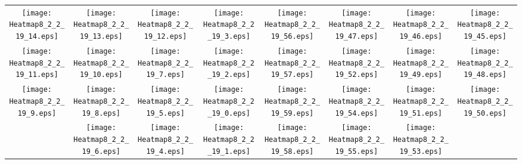\documentclass{standalone}
\begin{document}
\begin{tabular}{ *8{c} }
\texttt{[image: Heatmap8\_2\_2\_19\_14.eps]} & \texttt{[image: Heatmap8\_2\_2\_19\_13.eps]} & \texttt{[image: Heatmap8\_2\_2\_19\_12.eps]} & \texttt{[image: Heatmap8\_2\_2\_19\_3.eps]} & \texttt{[image: Heatmap8\_2\_2\_19\_56.eps]} & \texttt{[image: Heatmap8\_2\_2\_19\_47.eps]} & \texttt{[image: Heatmap8\_2\_2\_19\_46.eps]} & \texttt{[image: Heatmap8\_2\_2\_19\_45.eps]} \\
\texttt{[image: Heatmap8\_2\_2\_19\_11.eps]} & \texttt{[image: Heatmap8\_2\_2\_19\_10.eps]} & \texttt{[image: Heatmap8\_2\_2\_19\_7.eps]} & \texttt{[image: Heatmap8\_2\_2\_19\_2.eps]} & \texttt{[image: Heatmap8\_2\_2\_19\_57.eps]} & \texttt{[image: Heatmap8\_2\_2\_19\_52.eps]} & \texttt{[image: Heatmap8\_2\_2\_19\_49.eps]} & \texttt{[image: Heatmap8\_2\_2\_19\_48.eps]} \\
\texttt{[image: Heatmap8\_2\_2\_19\_9.eps]} & \texttt{[image: Heatmap8\_2\_2\_19\_8.eps]} & \texttt{[image: Heatmap8\_2\_2\_19\_5.eps]} & \texttt{[image: Heatmap8\_2\_2\_19\_0.eps]} & \texttt{[image: Heatmap8\_2\_2\_19\_59.eps]} & \texttt{[image: Heatmap8\_2\_2\_19\_54.eps]} & \texttt{[image: Heatmap8\_2\_2\_19\_51.eps]} & \texttt{[image: Heatmap8\_2\_2\_19\_50.eps]} \\
 & \texttt{[image: Heatmap8\_2\_2\_19\_6.eps]} & \texttt{[image: Heatmap8\_2\_2\_19\_4.eps]} & \texttt{[image: Heatmap8\_2\_2\_19\_1.eps]} & \texttt{[image: Heatmap8\_2\_2\_19\_58.eps]} & \texttt{[image: Heatmap8\_2\_2\_19\_55.eps]} & \texttt{[image: Heatmap8\_2\_2\_19\_53.eps]} &  
\end{tabular}
\end{document}

